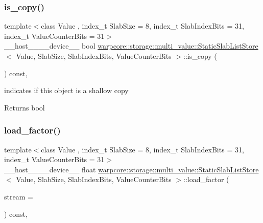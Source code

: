 \subsubsection{\texorpdfstring{is\+\_\+copy()}{is\_copy()}}
{\footnotesize\ttfamily template$<$class Value , index\+\_\+t Slab\+Size = 8, index\+\_\+t Slab\+Index\+Bits = 31, index\+\_\+t Value\+Counter\+Bits = 31$>$ \\
\+\_\+\+\_\+host\+\_\+\+\_\+\+\_\+\+\_\+device\+\_\+\+\_\+ bool \hyperlink{classwarpcore_1_1storage_1_1multi__value_1_1StaticSlabListStore}{warpcore\+::storage\+::multi\+\_\+value\+::\+Static\+Slab\+List\+Store}$<$ Value, Slab\+Size, Slab\+Index\+Bits, Value\+Counter\+Bits $>$\+::is\+\_\+copy (\begin{DoxyParamCaption}{ }\end{DoxyParamCaption}) const\hspace{0.3cm}{\ttfamily [inline]}, {\ttfamily [noexcept]}}



indicates if this object is a shallow copy 

\begin{DoxyReturn}{Returns}
{\ttfamily bool} 
\end{DoxyReturn}
\mbox{\label{classwarpcore_1_1storage_1_1multi__value_1_1StaticSlabListStore_a8f740ca66f7e508d8d58c463d816b92e}} 
\subsubsection{\texorpdfstring{load\+\_\+factor()}{load\_factor()}}
{\footnotesize\ttfamily template$<$class Value , index\+\_\+t Slab\+Size = 8, index\+\_\+t Slab\+Index\+Bits = 31, index\+\_\+t Value\+Counter\+Bits = 31$>$ \\
\+\_\+\+\_\+host\+\_\+\+\_\+\+\_\+\+\_\+device\+\_\+\+\_\+ float \hyperlink{classwarpcore_1_1storage_1_1multi__value_1_1StaticSlabListStore}{warpcore\+::storage\+::multi\+\_\+value\+::\+Static\+Slab\+List\+Store}$<$ Value, Slab\+Size, Slab\+Index\+Bits, Value\+Counter\+Bits $>$\+::load\+\_\+factor (\begin{DoxyParamCaption}\item[{cuda\+Stream\+\_\+t}]{stream = {} }\end{DoxyParamCaption}) const\hspace{0.3cm}{\ttfamily [inline]}, {\ttfamily [noexcept]}}



